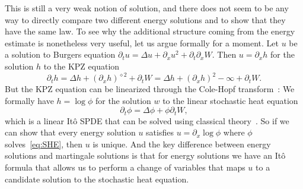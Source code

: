 \documentclass[a4paper,11pt]{article}
\newcommand{\1}{\mathds{1}}
\begin{document}
This is still a very weak notion of solution, and there does not seem to be
any way to directly compare two different energy solutions and to show that
they have the same law. To see why the additional structure coming from the
energy estimate is nonetheless very useful, let us argue formally for a
moment. Let $u$ be a solution to Burgers equation $\partial_t u = \Delta u +
\partial_x u^2 +  \partial_t \partial_x W$. Then $u = \partial_x h$ for the solution $h$
to the KPZ equation
\[ \partial_t h = \Delta h + (\partial_x h)^{\diamond 2} + \partial_t W = \Delta h + (\partial_x h)^{2} - \infty + \partial_t W . \]
But the KPZ equation can be linearized through the Cole-Hopf transform~\cite{BG97}: We
formally have $h = \log \phi$ for the solution $w$ to the linear stochastic heat
equation
\begin{equation}\label{eq:SHE}
   \partial_t \phi = \Delta \phi + \phi \partial_t W,
\end{equation}
which is a linear It{\^o} SPDE that can be solved using classical
theory~{\cite{W86,DPZ14,PR07}}. So if we can show that every energy
solution $u$ satisfies $u = \partial_x \log \phi$ where $\phi$ solves~\eqref{eq:SHE}, then
$u$ is unique. And the key difference between energy solutions and martingale solutions is that for energy solutions we have an It\^o formula that allows us to perform a change of variables that maps $u$ to a candidate solution to the stochastic heat equation.
\end{document}
